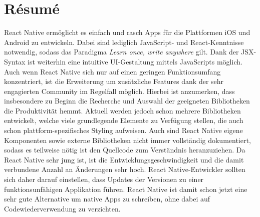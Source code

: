 \section{Résumé}
React Native ermöglicht es einfach und rasch Apps für die Plattformen iOS und Android zu entwickeln. Dabei sind lediglich JavaScript- und React-Kenntnisse notwendig, sodass das Paradigma \textit{Learn once, write anywhere} gilt. Dank der JSX-Syntax ist weiterhin eine intuitive UI-Gestaltung mittels JavaScripts möglich. Auch wenn React Native sich nur auf einen geringen Funktionsumfang konzentriert, ist die Erweiterung um zusätzliche Features dank der sehr engagierten Community im Regelfall möglich. Hierbei ist anzumerken, dass insbesondere zu Beginn die Recherche und Auswahl der geeigneten Bibliotheken die Produktivität hemmt. Aktuell werden jedoch schon mehrere Bibliotheken entwickelt, welche viele grundlegende Elemente zu Verfügung stellen, die auch schon plattform-spezifisches Styling aufweisen. Auch sind React Native eigene Komponenten sowie externe Bibliotheken nicht immer vollständig dokumentiert, sodass es teilweise nötig ist den Quellcode zum Verständnis heranzuziehen. Da React Native sehr jung ist, ist die Entwicklungsgeschwindigkeit und die damit verbundene Anzahl an Änderungen sehr hoch. React Native-Entwickler sollten sich daher darauf einstellen, dass Updates der Versionen zu einer funktionsunfähigen Applikation führen. 
React Native ist damit schon jetzt eine sehr gute Alternative um native Apps zu schreiben, ohne dabei auf Codewiederverwendung zu verzichten.